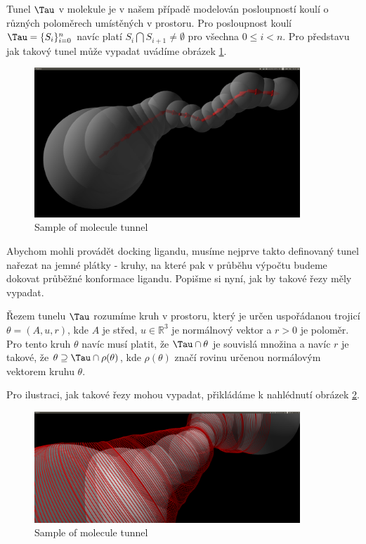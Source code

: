 Tunel $ \Tau $ v molekule je v našem případě modelován posloupností koulí o různých poloměrech umístěných v prostoru. Pro posloupnost koulí $ \Tau = \{S_i\}_{i=0}^{n} $ navíc platí $ S_i \bigcap S_{i+1} \neq \emptyset $ pro všechna $ 0 \leq i < n $.
Pro představu jak takový tunel může vypadat uvádíme obrázek \ref{fig:basic_tunnel}.
\begin{figure}
  	\centering
	\includegraphics[width=100mm]{img/basic_tunnel.jpg}
	\caption{Sample of molecule tunnel}
  \centering
  \label{fig:basic_tunnel}
\end{figure}


Abychom mohli provádět docking ligandu, musíme nejprve takto definovaný tunel nařezat na jemné plátky - kruhy, na které pak v průběhu výpočtu budeme dokovat průběžné konformace ligandu. Popišme si nyní, jak by takové řezy měly vypadat.

\begin{defi}
Řezem tunelu $ \Tau $ rozumíme kruh v prostoru, který je určen uspořádanou trojicí $\theta = (A, u, r)$, kde $ A $ je střed, $ u \in \mathbb{R}^3 $ je normálnový vektor a $ r > 0 $ je poloměr.
Pro tento kruh $ \theta $ navíc musí platit, že $ \Tau \cap \theta $ je souvislá množina a navíc
$ r $ je takové, že $ \theta \supseteq \Tau \cap \rho(\theta) $, kde $ \rho(\theta) $ značí rovinu určenou normálovým vektorem kruhu $ \theta $.
\end{defi}
Pro ilustraci, jak takové řezy mohou vypadat, přikládáme k nahlédnutí obrázek \ref{fig:tunnel_cuts}.
\begin{figure}
    \centering
    \includegraphics[width=100mm]{img/simple_cuts.png}
    \caption{Sample of molecule tunnel}
  \centering
  \label{fig:tunnel_cuts}
\end{figure}


